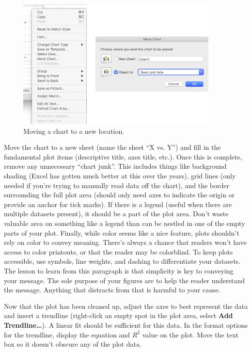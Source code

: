 \documentclass[nobib,nofonts,nols,nohyper]{tufte-handout}
\begin{document}
\begin{figure}[ht]
	\centering
	\includegraphics[width=0.9\textwidth]{images/move_chart.png}
	\caption{Moving a chart to a new location.}
	\label{fig:move_chart}
\end{figure}

Move the chart to a new sheet (name the sheet ``X vs. Y'') and fill in the fundamental plot items (descriptive title, axes title, etc.). 
Once this is complete, remove any unnecessary ``chart junk''. 
This includes things like background shading (Excel has gotten much better at this over the years), grid lines (only needed if you're trying to manually read data off the chart), and the border surrounding the full plot area (should only need axes to indicate the origin or provide an anchor for tick marks). 
If there is a legend (useful when there are multiple datasets present), it should be a part of the plot area. 
Don't waste valuable area on something like a legend than can be nestled in one of the empty parts of your plot. 
Finally, while color seems like a nice feature, plots shouldn't rely on color to convey meaning. 
There's always a chance that readers won't have access to color printouts, or that the reader may be colorblind. 
To keep plots accessible, use symbols, line weights, and dashing to differentiate your datasets. 
The lesson to learn from this paragraph is that simplicity is key to conveying your message. 
The sole purpose of your figures are to help the reader understand the message.
Anything that distracts from that is harmful to your cause.

Now that the plot has been cleaned up, adjust the axes to best represent the data and insert a trendline (right-click an empty spot in the plot area, select \textbf{Add Trendline…}). 
A linear fit should be sufficient for this data. 
In the format options for the trendline, display the equation and \( R^2 \) value on the plot. 
Move the text box so it doesn't obscure any of the plot data.
\end{document}
